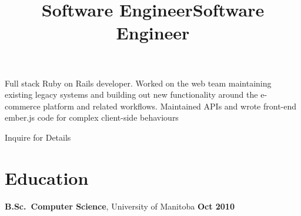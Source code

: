 \documentclass[margin,line,letterpaper]{resume}
\begin{document}
\begin{resume}
  \title{\bf Software Engineer}
  \location{}
  \begin{position}
    Full stack Ruby on Rails developer. Worked on the web team
    maintaining existing legacy systems and building out new
    functionality around the e-commerce platform and related
    workflows. Maintained APIs and wrote front-end ember.js code
    for complex client-side behaviours
  \end{position}


  \title{\bf Software Engineer}
  \location{}
  \begin{position}
    Inquire for Details
  \end{position}


  \section{\mysidestyle Education}

  {\bf B.Sc.~Computer Science}, University of Manitoba \hfill {\bf Oct 2010}

\end{resume}
\end{document}
